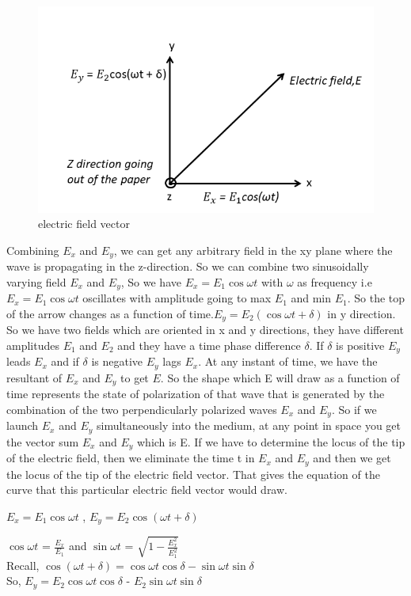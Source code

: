 \begin{figure}[h]
\centering
\includegraphics[width=1\linewidth]{./graphics/E_components}
\caption{electric field vector}
\label{electric field vector components}
\end{figure}
Combining $E_x$ and $E_y$, we can get any arbitrary field in the xy plane where the wave is propagating in the z-direction. So we can combine two sinusoidally varying field $E_x$ and $E_y$, So we have $E_x = E_{1}\cos\omega t$ with $\omega$ as frequency i.e$ E_x = E_{1}\cos\omega t$ oscillates with amplitude going to max $E_{1}$ and min $E_{1}$. So the top of the arrow changes as a function of time.$ E_y = E_{2}(\cos\omega t + \delta)$ in y direction. So we have two fields which are oriented in x and y directions, they have different amplitudes $E_{1}$ and $E_{2}$ and they have a time phase difference $\delta$. If $\delta$ is positive $E_y$ leads $E_x$ and if $\delta$ is negative $E_y$ lags $E_x$. At any instant of time, we have the resultant of $E_x$ and $E_y$ to get $E$. So the shape which E will draw as a function of time represents the state of polarization of that wave that is generated by the combination of the two perpendicularly polarized waves $E_x$ and $E_y$. So if we launch $E_x$ and $E_y$ simultaneously into the medium, at any point in space you get the vector sum $E_x$ and $E_y$ which is E. If we have to determine the locus of the tip of the electric field, then we eliminate the time t in $E_x$ and $E_y$ and then we get the locus of the tip of the electric field vector. That gives the equation of the curve that this particular electric field vector would draw.

$E_x = E_{1}\cos\omega t$ , $E_y = E_{2}\cos(\omega t + \delta)$

$\cos\omega t$ = $\frac{E_x}{E_1}$ and $\sin\omega t$ = $\sqrt{1 - \frac{E_x^2}{E_{1}^2}}$
\\
Recall, $\cos(\omega t + \delta) = \cos\omega t\cos\delta - \sin\omega t\sin\delta$
\\
So,
$E_y = E_{2}\cos\omega t\cos\delta$ - $E_{2}\sin\omega t\sin\delta$

